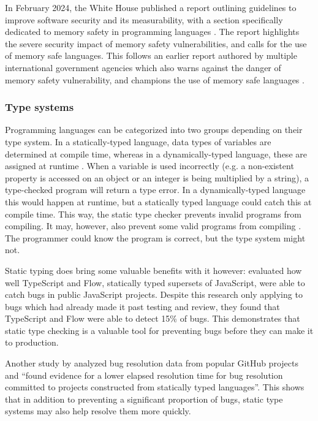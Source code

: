 In February 2024, the White House published a report outlining guidelines to improve software security and its measurability, with a section specifically dedicated to memory safety in programming languages \autocite{NationalCyberDirector2024}. The report highlights the severe security impact of memory safety vulnerabilities, and calls for the use of memory safe languages. This follows an earlier report authored by multiple international government agencies which also warns against the danger of memory safety vulnerability, and champions the use of memory safe languages \autocite{CISA2023}.

\subsubsection{Type systems}
Programming languages can be categorized into two groups depending on their type system. In a statically-typed language, data types of variables are determined at compile time, whereas in a dynamically-typed language, these are assigned at runtime \autocite{MDNStaticTyping,MDNDynamicTyping}. When a variable is used incorrectly (e.g. a non-existent property is accessed on an object or an integer is being multiplied by a string), a type-checked program will return a type error. In a dynamically-typed language this would happen at runtime, but a statically typed language could catch this at compile time. This way, the static type checker prevents invalid programs from compiling. It may, however, also prevent some valid programs from compiling \autocite{Mitchell1990}. The programmer could know the program is correct, but the type system might not.

Static typing does bring some valuable benefits with it however: \textcite{Gao2017} evaluated how well TypeScript and Flow, statically typed supersets of JavaScript, were able to catch bugs in public JavaScript projects. Despite this research only applying to bugs which had already made it past testing and review, they found that TypeScript and Flow were able to detect 15\% of bugs. This demonstrates that static type checking is a valuable tool for preventing bugs before they can make it to production.

Another study by \textcite{Zhang2021} analyzed bug resolution data from popular GitHub projects and ``found evidence for a lower elapsed resolution time for bug resolution committed to projects constructed from statically typed languages''. This shows that in addition to preventing a significant proportion of bugs, static type systems may also help resolve them more quickly.

